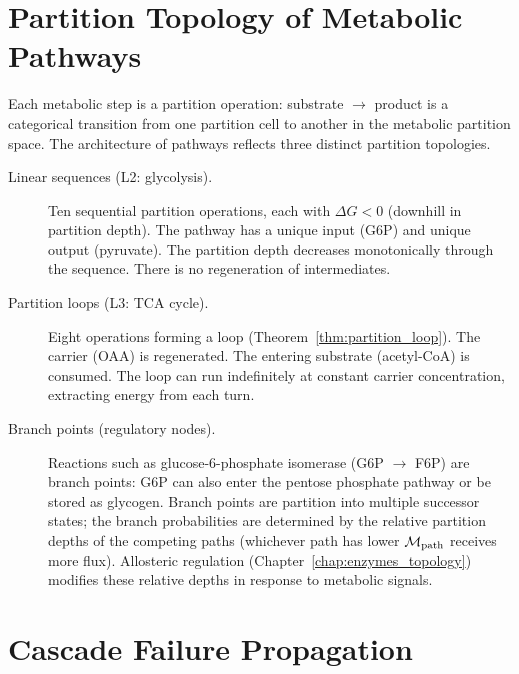\section{Partition Topology of Metabolic Pathways}
\label{sec:pathway_topology}

Each metabolic step is a partition operation: substrate $\to$ product is a
categorical transition from one partition cell to another in the metabolic
partition space. The architecture of pathways reflects three distinct partition
topologies.

\begin{description}
  \item[Linear sequences (L2: glycolysis).] Ten sequential partition operations,
    each with $\Delta G < 0$ (downhill in partition depth). The pathway has a
    unique input (G6P) and unique output (pyruvate). The partition depth
    decreases monotonically through the sequence. There is no regeneration
    of intermediates.
  \item[Partition loops (L3: TCA cycle).] Eight operations forming a loop
    (Theorem~\ref{thm:partition_loop}). The carrier (OAA) is regenerated.
    The entering substrate (acetyl-CoA) is consumed. The loop can run
    indefinitely at constant carrier concentration, extracting energy from
    each turn.
  \item[Branch points (regulatory nodes).] Reactions such as glucose-6-phosphate
    isomerase (G6P $\to$ F6P) are branch points: G6P can also enter the
    pentose phosphate pathway or be stored as glycogen. Branch points are
    partition into multiple successor states; the branch probabilities are
    determined by the relative partition depths of the competing paths
    (whichever path has lower $\mathcal{M}_{\mathrm{path}}$ receives more flux).
    Allosteric regulation (Chapter~\ref{chap:enzymes_topology}) modifies
    these relative depths in response to metabolic signals.
\end{description}

\section{Cascade Failure Propagation}
\label{sec:cascade_failure}


